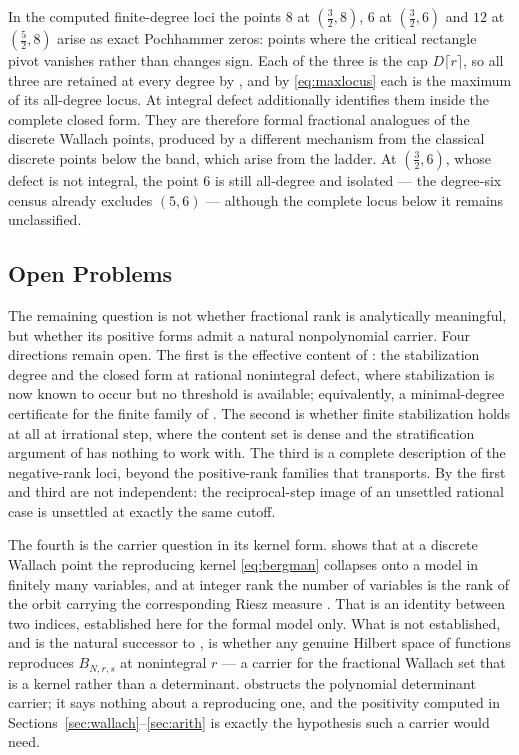 \documentclass[11pt,letterpaper]{article}
\begin{document}
\begin{remark}
\label{rem:isolated}
In the computed finite-degree loci the points $8$ at $(\tfrac32,8)$, $6$ at
$(\tfrac32,6)$ and $12$ at $(\tfrac52,8)$ arise as exact Pochhammer zeros: points
where the critical rectangle pivot vanishes rather than changes sign. Each of the
three is the cap $D\lceil r\rceil$, so all three are retained at every degree by
, and by \eqref{eq:maxlocus} each is the maximum of its
all-degree locus. At integral defect  additionally identifies them
inside the complete closed form. They are therefore formal fractional analogues of
the discrete Wallach points, produced by a different mechanism from the classical
discrete points below the band, which arise from the ladder. At $(\tfrac32,6)$,
whose defect is not integral, the point $6$ is still all-degree and isolated ---
the degree-six census already excludes $(5,6)$ --- although the complete locus
below it remains unclassified.
\end{remark}

\subsection{Open Problems}

The remaining question is not whether fractional rank is analytically meaningful,
but whether its positive forms admit a natural nonpolynomial carrier. Four
directions remain open. The first is the effective content of
: the stabilization degree and the closed form at rational
nonintegral defect, where stabilization is now known to occur but no threshold is
available; equivalently, a minimal-degree certificate for the finite family of
. The second is whether finite stabilization holds at all at
irrational step, where the content set is dense and the stratification argument of
 has nothing to work with. The third is a complete description
of the negative-rank loci, beyond the positive-rank families that
 transports. By  the first and third are not
independent: the reciprocal-step image of an unsettled rational case is unsettled
at exactly the same cutoff.

The fourth is the carrier question in its kernel form.  shows
that at a discrete Wallach point the reproducing kernel \eqref{eq:bergman}
collapses onto a model in finitely many variables, and at integer rank the number
of variables is the rank of the orbit carrying the corresponding Riesz measure
\cite[Prop.~VII.2.3]{FK}. That is an identity between two indices, established
here for the formal model only. What is not established, and is the natural
successor to , is whether any genuine Hilbert space of
functions reproduces $B_{N,r,s}$ at nonintegral $r$ --- a carrier for the
fractional Wallach set that is a kernel rather than a determinant.
 obstructs the polynomial determinant carrier; it says
nothing about a reproducing one, and the positivity computed in
Sections~\ref{sec:wallach}--\ref{sec:arith} is exactly the hypothesis such a
carrier would need.
\end{document}
